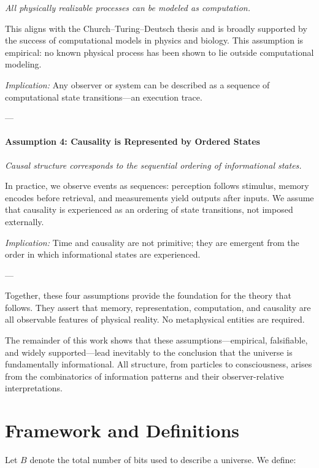 \documentclass[12pt]{article}
\begin{document}
\emph{All physically realizable processes can be modeled as computation.}

\vspace{0.2em}
This aligns with the Church–Turing–Deutsch thesis and is broadly supported by the success of computational models in physics and biology. This assumption is empirical: no known physical process has been shown to lie outside computational modeling.

\emph{Implication:} Any observer or system can be described as a sequence of computational state transitions—an execution trace.

---

\paragraph{Assumption 4: Causality is Represented by Ordered States}

\emph{Causal structure corresponds to the sequential ordering of informational states.}

\vspace{0.2em}
In practice, we observe events as sequences: perception follows stimulus, memory encodes before retrieval, and measurements yield outputs after inputs. We assume that causality is experienced as an ordering of state transitions, not imposed externally.

\emph{Implication:} Time and causality are not primitive; they are emergent from the order in which informational states are experienced.

---

Together, these four assumptions provide the foundation for the theory that follows. They assert that memory, representation, computation, and causality are all observable features of physical reality. No metaphysical entities are required.

The remainder of this work shows that these assumptions—empirical, falsifiable, and widely supported—lead inevitably to the conclusion that the universe is fundamentally informational. All structure, from particles to consciousness, arises from the combinatorics of information patterns and their observer-relative interpretations.



\section{Framework and Definitions}

Let $B$ denote the total number of bits used to describe a universe. We define:
\end{document}
